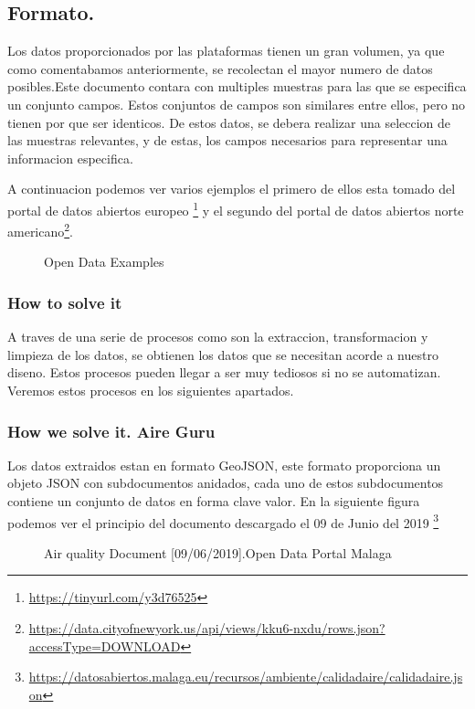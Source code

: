 \subsection{Formato.}

Los datos proporcionados por las plataformas tienen un gran volumen, ya que como comentabamos anteriormente, se recolectan
el mayor numero de datos posibles.Este documento contara con multiples muestras para las que
se especifica un conjunto campos. Estos conjuntos de campos son similares entre ellos, pero no tienen por que ser identicos. 
De estos datos, se debera realizar una seleccion de las muestras relevantes, y de estas, los campos necesarios para representar
una informacion especifica.


A continuacion podemos ver varios ejemplos el primero de ellos esta tomado del portal de datos abiertos europeo
\footnote{\url{https://tinyurl.com/y3d76525}} y el segundo del portal de datos abiertos norte americano\footnote{\url{https://data.cityofnewyork.us/api/views/kku6-nxdu/rows.json?accessType=DOWNLOAD}}.

\begin{figure}[h]
    \centering
    \hfill
    \caption{Open Data Examples}
\end{figure}

    

    
\subsubsection{How to solve it} 
A traves de una serie de procesos como son  la extraccion, transformacion y 
limpieza de los datos, se obtienen los datos que se necesitan acorde a nuestro diseno. Estos procesos pueden llegar
a ser muy tediosos si no se automatizan.
Veremos estos procesos en los siguientes apartados.
\subsubsection{How we solve it. Aire Guru} 

Los datos extraidos estan en formato GeoJSON, este formato proporciona un objeto JSON con subdocumentos anidados, cada uno de estos
subdocumentos contiene un conjunto de datos en forma clave valor. 
En la siguiente figura podemos ver el principio del documento descargado el 09 de Junio del 2019 
\footnote{\url{https://datosabiertos.malaga.eu/recursos/ambiente/calidadaire/calidadaire.json}}\\
\newpage
\begin{figure}[h]
    \centering
   \hfill
 
    \caption{Air quality Document [09/06/2019].Open Data Portal Malaga}
    \end{figure}
    
